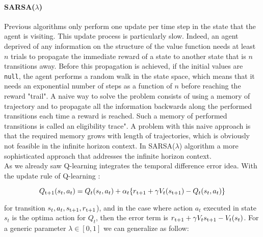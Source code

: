 \paragraph{SARSA($\lambda$)} Previous algorithms only perform one update per time step in the state that the agent is visiting. This update process is particularly slow. Indeed, an agent deprived of any information on the structure of the value function needs at least $n$ trials to propagate the immediate reward of a state to another state that is $n$ transitions away. Before this propagation is achieved, if the initial values are {\tt null}, the agent performs a random walk in the state space, which means that it needs an exponential number of steps as a function of $n$ before reaching the reward "trail". A naive way to solve the problem consists of using a memory of trajectory and to propagate all the information backwards along the performed transitions each time a reward is reached. Such a memory of performed transitions is called an eligibility trace". A problem with this naive approach is that the required memory grows with length of trajectories, which is obviously not feasible in the infinite horizon context. In SARSA($\lambda$) algorithm a more sophisticated approach that addresses the infinite horizon context. \\

As we already saw Q-learning integrates the temporal difference error idea. With the update rule of Q-learning :

\begin{equation}
	Q\textsubscript{t+1} (s_t, a_t) = Q_t(s_t, a_t) + \alpha_t\{r\textsubscript{t+1} + \gamma V_t(s\textsubscript{t+1}) - Q_t(s_t, a_t)\}
\end{equation}

for transition $s_t, a_t, s\textsubscript{t+1}, r\textsubscript{t+1}$), and in the case where action $a_t$ executed in state $s_t$ is the optima action for $Q_t$, then the error term is $r\textsubscript{t+1} + \gamma V_t s\textsubscript{t+1} - V_t(s_t)$. For a generic parameter $\lambda \in [0,1]$ we can generalize as follow:

